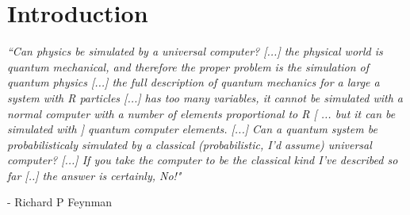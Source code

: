 \documentclass[12pt,a4paper]{report}
\begin{document}
\chapter*{Introduction}
\emph{“Can physics be simulated by a universal computer? [...] the physical world is quantum mechanical, and therefore the proper problem is the simulation of quantum physics [...] the full description of quantum mechanics for a large a system with R particles [...] has too many variables, it cannot be simulated with a normal computer with a number of elements proportional to R [ ... but it can be simulated with ] quantum computer elements. [...] Can a quantum system be probabilisticaly simulated by a classical (probabilistic, I’d assume) universal computer? [...] If you take the computer to be the classical kind I’ve described so far [..] the answer is certainly, No!"} 
\begin{flushright}
- Richard P Feynman \cite{feynman82}\cite{nielsen}
\end{flushright}
\end{document}
